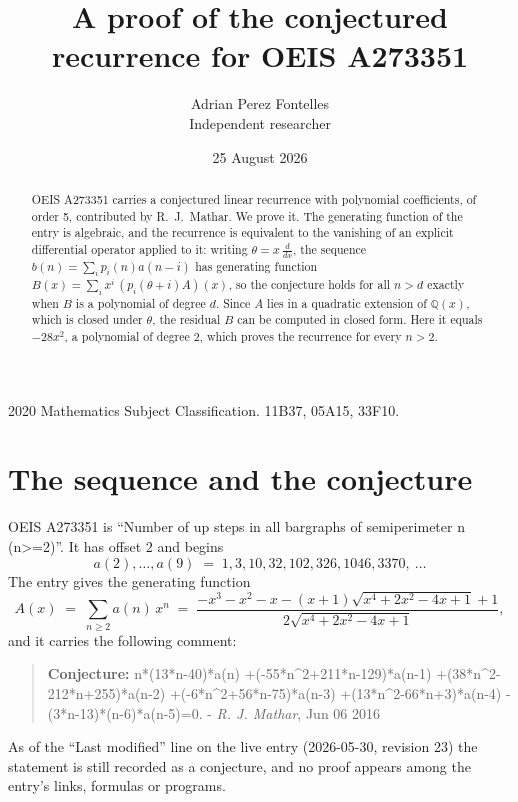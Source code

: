 \documentclass[11pt,a4paper]{article}
\title{A proof of the conjectured recurrence for OEIS A273351}
\author{Adrian Perez Fontelles\\ \small Independent researcher}
\date{25 August 2026}
\theoremstyle{plain}
\theoremstyle{definition}
\begin{document}
\maketitle

\begin{abstract}
OEIS A273351 carries a conjectured linear recurrence with polynomial coefficients, of
order 5, contributed by R.~J.~Mathar. We prove it. The generating function of the
entry is algebraic, and the recurrence is equivalent to the vanishing of an explicit
differential operator applied to it: writing $\theta=x\,\frac{d}{dx}$, the sequence
$b(n)=\sum_{i}p_{i}(n)a(n-i)$ has generating function
$B(x)=\sum_{i}x^{i}\,(p_{i}(\theta+i)A)(x)$, so the conjecture holds for all $n>d$ exactly
when $B$ is a polynomial of degree $d$. Since $A$ lies in a quadratic extension of
$\mathbb{Q}(x)$, which is closed under $\theta$, the residual $B$ can be computed in
closed form. Here it equals $- 28 x^{2}$, a polynomial of degree $2$, which proves
the recurrence for every $n>2$.
\end{abstract}

\noindent\small 2020 Mathematics Subject Classification. 11B37, 05A15, 33F10.\normalsize

\section{The sequence and the conjecture}

OEIS A273351 is ``Number of up steps in all bargraphs of semiperimeter n (n>=2)''. It has offset $2$ and begins
\[
a(2),\dots,a(9)\;=\;1, 3, 10, 32, 102, 326, 1046, 3370,\ \dots
\]
The entry gives the generating function
\begin{equation}\label{eq:gf}
A(x)\;=\;\sum_{n\ge 2} a(n)\,x^{n}\;=\;\frac{- x^{3} - x^{2} - x - \left(x + 1\right) \sqrt{x^{4} + 2 x^{2} - 4 x + 1} + 1}{2 \sqrt{x^{4} + 2 x^{2} - 4 x + 1}} ,
\end{equation}
and it carries the following comment:
\begin{quote}\small
\textbf{Conjecture:} n*(13*n-40)*a(n) +(-55*n\^{}2+211*n-129)*a(n-1) +(38*n\^{}2-212*n+255)*a(n-2) +(-6*n\^{}2+56*n-75)*a(n-3) +(13*n\^{}2-66*n+3)*a(n-4) -(3*n-13)*(n-6)*a(n-5)=0. - \emph{R. J. Mathar}, Jun 06 2016
\end{quote}
As of the ``Last modified'' line on the live entry (2026-05-30, revision 23) the
statement is still recorded as a conjecture, and no proof appears among the entry's links,
formulas or programs.
\end{document}
